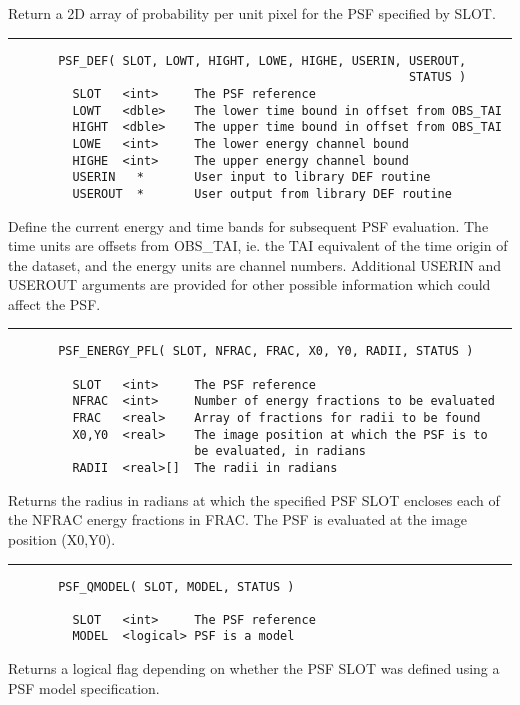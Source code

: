          Return a 2D array of probability per unit pixel for the
         PSF specified by SLOT.

\rule{\textwidth}{0.5mm}
\begin{verbatim}
       PSF_DEF( SLOT, LOWT, HIGHT, LOWE, HIGHE, USERIN, USEROUT,
                                                        STATUS )
         SLOT   <int>     The PSF reference
         LOWT   <dble>    The lower time bound in offset from OBS_TAI
         HIGHT  <dble>    The upper time bound in offset from OBS_TAI
         LOWE   <int>     The lower energy channel bound
         HIGHE  <int>     The upper energy channel bound
         USERIN   *       User input to library DEF routine
         USEROUT  *       User output from library DEF routine
\end{verbatim}

         Define the current energy and time bands for subsequent
         PSF evaluation. The time units are offsets from OBS\_TAI,
         ie. the TAI equivalent of the time origin of the dataset,
         and the energy units are channel numbers. Additional 
         USERIN and USEROUT arguments are provided for other
         possible information which could affect the PSF.

\rule{\textwidth}{0.5mm}
\begin{verbatim}
       PSF_ENERGY_PFL( SLOT, NFRAC, FRAC, X0, Y0, RADII, STATUS )

         SLOT   <int>     The PSF reference
         NFRAC  <int>     Number of energy fractions to be evaluated
         FRAC   <real>    Array of fractions for radii to be found
         X0,Y0  <real>    The image position at which the PSF is to
                          be evaluated, in radians
         RADII  <real>[]  The radii in radians
\end{verbatim}

         Returns the radius in radians at which the specified PSF
         SLOT encloses each of the NFRAC energy fractions in FRAC.
         The PSF is evaluated at the image position (X0,Y0).

\rule{\textwidth}{0.5mm}
\begin{verbatim}
       PSF_QMODEL( SLOT, MODEL, STATUS )

         SLOT   <int>     The PSF reference
         MODEL  <logical> PSF is a model
\end{verbatim}

         Returns a logical flag depending on whether the PSF SLOT
         was defined using a PSF model specification.

